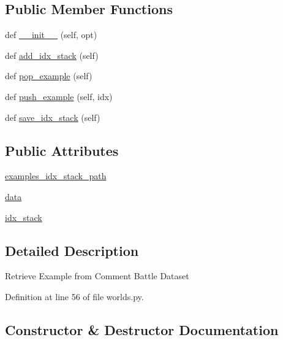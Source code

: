 \subsection*{Public Member Functions}
\begin{DoxyCompactItemize}
\item 
def \hyperlink{classigc__evals_1_1worlds_1_1IGCExampleGenerator_a44d9772a080f6ec923cdd13392a47f5e}{\+\_\+\+\_\+init\+\_\+\+\_\+} (self, opt)
\item 
def \hyperlink{classigc__evals_1_1worlds_1_1IGCExampleGenerator_aa0801aa3a53c7fd57a759c2080936174}{add\+\_\+idx\+\_\+stack} (self)
\item 
def \hyperlink{classigc__evals_1_1worlds_1_1IGCExampleGenerator_a68420b6b80ae5d3a8825302359371ed5}{pop\+\_\+example} (self)
\item 
def \hyperlink{classigc__evals_1_1worlds_1_1IGCExampleGenerator_a34dc6ef46a9ba8a1c72c8b674ff444b9}{push\+\_\+example} (self, idx)
\item 
def \hyperlink{classigc__evals_1_1worlds_1_1IGCExampleGenerator_a3f787da040d9b83d9c857b8ef65d36eb}{save\+\_\+idx\+\_\+stack} (self)
\end{DoxyCompactItemize}
\subsection*{Public Attributes}
\begin{DoxyCompactItemize}
\item 
\hyperlink{classigc__evals_1_1worlds_1_1IGCExampleGenerator_aa309ee59a607d747c0f9868951ecba0a}{examples\+\_\+idx\+\_\+stack\+\_\+path}
\item 
\hyperlink{classigc__evals_1_1worlds_1_1IGCExampleGenerator_ab21dfe02e8b60d4e37e25b8d942c4b61}{data}
\item 
\hyperlink{classigc__evals_1_1worlds_1_1IGCExampleGenerator_ac091cb764c64196d922d65d030f6ec57}{idx\+\_\+stack}
\end{DoxyCompactItemize}


\subsection{Detailed Description}
\begin{DoxyVerb}Retrieve Example from Comment Battle Dataset\end{DoxyVerb}
 

Definition at line 56 of file worlds.\+py.



\subsection{Constructor \& Destructor Documentation}
\mbox{\label{classigc__evals_1_1worlds_1_1IGCExampleGenerator_a44d9772a080f6ec923cdd13392a47f5e}} 

